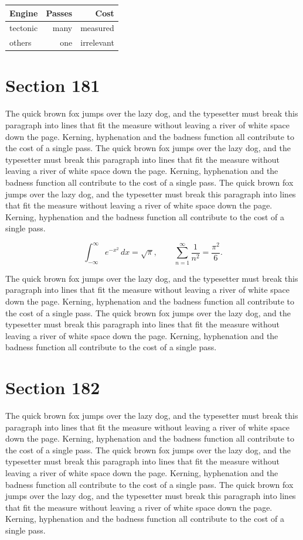 \documentclass{article}
\begin{document}
\begin{center}
\begin{tabular}{lrr}
\toprule
Engine & Passes & Cost \\
\midrule
tectonic & many & measured \\
others & one & irrelevant \\
\bottomrule
\end{tabular}
\end{center}

\section{Section 181}
The quick brown fox jumps over the lazy dog, and the typesetter must break this paragraph into lines that fit the measure without leaving a river of white space down the page. Kerning, hyphenation and the badness function all contribute to the cost of a single pass. The quick brown fox jumps over the lazy dog, and the typesetter must break this paragraph into lines that fit the measure without leaving a river of white space down the page. Kerning, hyphenation and the badness function all contribute to the cost of a single pass. The quick brown fox jumps over the lazy dog, and the typesetter must break this paragraph into lines that fit the measure without leaving a river of white space down the page. Kerning, hyphenation and the badness function all contribute to the cost of a single pass. 

\begin{equation}
\int_{-\infty}^{\infty} e^{-x^{2}}\,dx = \sqrt{\pi}, \qquad
\sum_{n=1}^{\infty} \frac{1}{n^{2}} = \frac{\pi^{2}}{6}.
\end{equation}

The quick brown fox jumps over the lazy dog, and the typesetter must break this paragraph into lines that fit the measure without leaving a river of white space down the page. Kerning, hyphenation and the badness function all contribute to the cost of a single pass. The quick brown fox jumps over the lazy dog, and the typesetter must break this paragraph into lines that fit the measure without leaving a river of white space down the page. Kerning, hyphenation and the badness function all contribute to the cost of a single pass. 
\section{Section 182}
The quick brown fox jumps over the lazy dog, and the typesetter must break this paragraph into lines that fit the measure without leaving a river of white space down the page. Kerning, hyphenation and the badness function all contribute to the cost of a single pass. The quick brown fox jumps over the lazy dog, and the typesetter must break this paragraph into lines that fit the measure without leaving a river of white space down the page. Kerning, hyphenation and the badness function all contribute to the cost of a single pass. The quick brown fox jumps over the lazy dog, and the typesetter must break this paragraph into lines that fit the measure without leaving a river of white space down the page. Kerning, hyphenation and the badness function all contribute to the cost of a single pass. 
\end{document}
